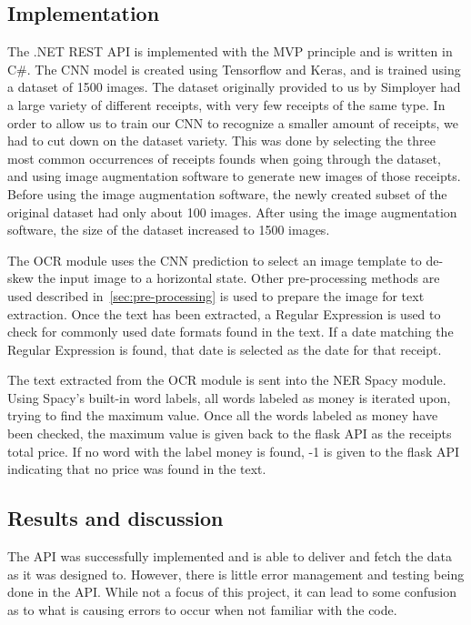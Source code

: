 \subsection{Implementation}\label{subsec:implementation}
The .NET REST API is implemented with the MVP principle and is written in C\#.
The CNN model is created using Tensorflow and Keras, and is trained using a dataset of 1500 images.
The dataset originally provided to us by Simployer had a large variety of different receipts, with very few receipts of the same type.
In order to allow us to train our CNN to recognize a smaller amount of receipts, we had to cut down on the dataset variety.
This was done by selecting the three most common occurrences of receipts founds when going through the dataset, and using image augmentation software to generate new images of those receipts.
Before using the image augmentation software, the newly created subset of the original dataset had only about 100 images.
After using the image augmentation software, the size of the dataset increased to 1500 images.

The OCR module uses the CNN prediction to select an image template to de-skew the input image to a horizontal state.
Other pre-processing methods are used described in~\ref{sec:pre-processing} is used to prepare the image for text
extraction.
Once the text has been extracted, a Regular Expression is used to check for commonly used date formats found in the text.
If a date matching the Regular Expression is found, that date is selected as the date for that receipt.

The text extracted from the OCR module is sent into the NER Spacy module.
Using Spacy's built-in word labels, all words labeled as money is iterated upon, trying to find the maximum value.
Once all the words labeled as money have been checked, the maximum value is given back to the flask API as the receipts total price.
If no word with the label money is found, -1 is given to the flask API indicating that no price was found in the text.

\subsection{Results and discussion}\label{subsec:resultsanddiscussion}
The API was successfully implemented and is able to deliver and fetch the data as it was designed to.
However, there is little error management and testing being done in the API.
While not a focus of this project, it can lead to some confusion as to what is causing errors to occur when not familiar with the code.

